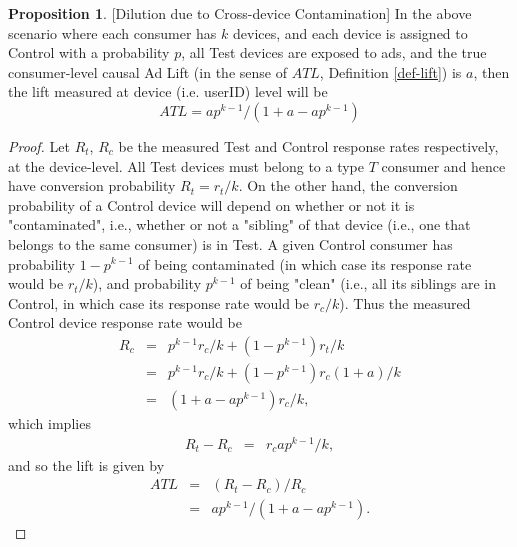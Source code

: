 \documentclass[11pt,a4paper]{article}
\theoremstyle{definition}
\theoremstyle{remark}
\theoremstyle{definition}
\theoremstyle{definition}
\theoremstyle{definition}
\theoremstyle{definition}
\theoremstyle{definition}
\theoremstyle{definition}
\newtheorem{proposition}[theorem]{Proposition}
\begin{document}
\begin{proposition}\small [Dilution due to Cross-device Contamination]
	In the above scenario where each consumer has $k$ devices, and each device is assigned to Control with a probability $p$, all Test devices are exposed to ads, and the true consumer-level causal Ad Lift (in the sense of $ATL$, Definition \ref{def-lift}) is $a$, then the lift measured at device (i.e. userID) level will be 
\begin{equation} \label{eq-atl-contam}
	ATL = 	a p^{k-1}/(1 + a - a p^{k-1})
\end{equation}	

\end{proposition}
\begin{proof}\small
Let $R_t$, $R_c$ be the measured Test and Control response rates respectively, at the device-level.
All Test devices must belong to a type $T$ consumer and hence have conversion probability $R_t = r_t/k$. 
On the other hand, the conversion probability of a Control device will depend on whether or not it is "contaminated", i.e., whether or not a "sibling" of that device (i.e., one that belongs to the same consumer) is in Test.
A given Control consumer has probability $1-p^{k-1}$ of being contaminated (in which case its response rate would be $r_t/k$), and probability  $p^{k-1}$ of being "clean" (i.e., all its siblings are in Control, in which case its response rate would be $r_c/k$). 
Thus the measured Control device response rate would be 
\begin{eqnarray}
R_c & = & p^{k-1} r_c/k + (1- p^{k-1})r_t/k \\
    & = & p^{k-1} r_c/k + (1- p^{k-1})r_c(1+a)/k \\
    & = & (1 + a - a p^{k-1})r_c/k,
\end{eqnarray}
which implies 
\begin{eqnarray}
R_t - R_c & = & r_c a p^{k-1}/k,
\end{eqnarray}
and so the lift is given by 
\begin{eqnarray}
ATL & = & (R_t - R_c)/R_c \\
        & = & a p^{k-1}/(1 + a - a p^{k-1}).
\end{eqnarray}
\end{proof}
\end{document}
